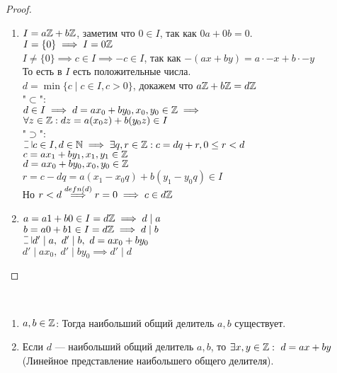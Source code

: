 \begin{normalsize}
\begin{proof}
    \begin{enumerate}
        \item $I = a\mathbb{Z} + b\mathbb{Z}$, заметим что $0 \in I$, так как $0a + 0b = 0$.\\
        $I = \{0\} \implies I = 0\mathbb{Z}$\\
        $I \neq \{0\} \implies c \in I \implies -c \in I$, так как $-(ax + by) = a \cdot -x + b \cdot -y$\\
        То есть в $I$ есть положительные числа.\\
        $d = \min\{ c \mid c \in I, c > 0 \}$, докажем что $a\mathbb{Z} + b\mathbb{Z} = d\mathbb{Z}$\\
        "$\subset$":\\
        $d \in I \implies d = ax_0 + by_0, x_0, y_0 \in \mathbb{Z} \implies$\\
        $\forall z \in \mathbb{Z}: dz = a(x_0z) + b(y_0z) \in I$\\
        "$\supset$":\\
        $\letus c \in I, d \in \mathN \implies \exists q, r \in \mathZ: c = dq + r, 0 \leq r < d$\\
        $c = ax_1 + by_1, x_1, y_1 \in \mathbb{Z}$\\
        $d = ax_0 + by_0, x_0, y_0 \in \mathbb{Z}$\\
        $r = c - dq = a(x_1 -x_0q) + b(y_1 - y_0q) \in I$\\
        Но $r < d \overset{defn(d)}{\implies} r = 0 \implies c \in d\mathbb{Z}$
        \item $a = a1 + b0 \in I = d\mathbb{Z} \implies d \mid a$\\
        $b = a0 + b1 \in I = d\mathbb{Z} \implies d \mid b$\\
        $\letus d' \mid a,~d' \mid b,~d=ax_0 + by_0$\\
        $d' \mid ax_0,~d' \mid by_0 \implies d' \mid d$
    \end{enumerate}
\end{proof}

\begin{follow}~
    \begin{enumerate}
        \item $a, b \in \mathbb{Z}$: Тогда наибольший общий делитель $a, b$ существует.
        \item Если $d$ --- наибольший общий делитель $a, b$, то $\exists x, y \in \mathbb{Z}:~d = ax + by$(Линейное представление наибольшего общего делителя).
    \end{enumerate}
\end{follow}


\end{normalsize}
